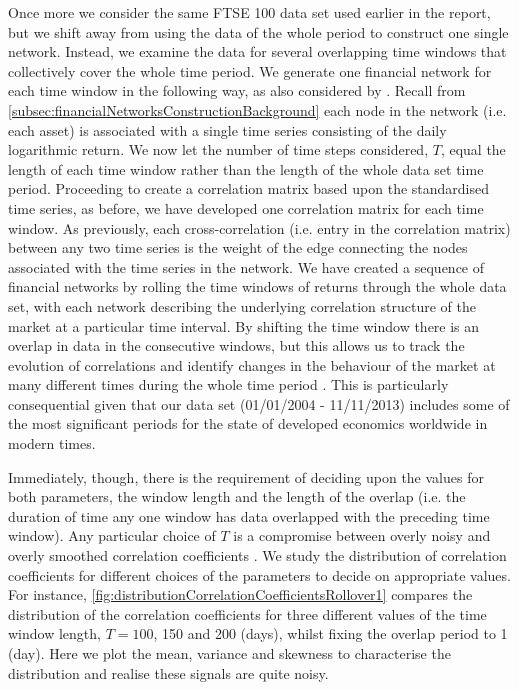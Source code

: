 Once more we consider the same FTSE 100 data set used earlier in the report, but we shift away from using the data of the whole period to construct one single network.
Instead, we examine the data for several overlapping time windows that collectively cover the whole time period.
We generate one financial network for each time window in the following way, as also considered by \cite{OCK+02,OKK03,BD10,FPM+10,FPW+11}.
Recall from \cref{subsec:financialNetworksConstructionBackground} each node in the network (i.e. each asset) is associated with a single time series consisting of the daily logarithmic return.
We now let the number of time steps considered, $T$, equal the length of each time window rather than the length of the whole data set time period.
Proceeding to create a correlation matrix based upon the standardised time series, as before, we have developed one correlation matrix for each time window.
As previously, each cross-correlation (i.e. entry in the correlation matrix) between any two time series is the weight of the edge connecting the nodes associated with the time series in the network.
We have created a sequence of financial networks by rolling the time windows of returns through the whole data set, with each network describing the underlying correlation structure of the market at a particular time interval.
By shifting the time window there is an overlap in data in the consecutive windows, but this allows us to track the evolution of correlations and identify changes in the behaviour of the market at many different times during the whole time period \cite{FPW+11}.
This is particularly consequential given that our data set (01/01/2004 - 11/11/2013) includes some of the most significant periods for the state of developed economics worldwide in modern times.

Immediately, though, there is the requirement of deciding upon the values for both parameters, the window length and the length of the overlap (i.e. the duration of time any one window has data overlapped with the preceding time window).
Any particular choice of $T$ is a compromise between overly noisy and overly smoothed correlation coefficients \cite{OCK+02,FPW+11}.
We study the distribution of correlation coefficients for different choices of the parameters to decide on appropriate values.
For instance, \cref{fig:distributionCorrelationCoefficientsRollover1} compares the distribution of the correlation coefficients for three different values of the time window length, $T=100$, 150 and 200 (days), whilst fixing the overlap period to 1 (day).
Here we plot the mean, variance and skewness to characterise the distribution and realise these signals are quite noisy.

